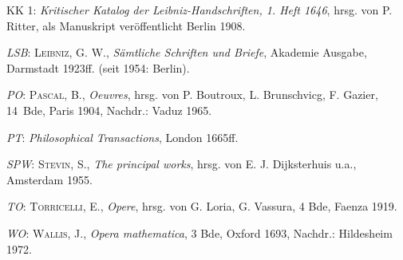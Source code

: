 \noindent\hangindent=10mm KK 1: \textit{Kritischer Katalog der Leibniz-Handschriften, 1. Heft 1646}, hrsg. von P. Ritter, als Manuskript ver\"{o}ffentlicht Berlin 1908.\par
\noindent\hangindent=10mm\textit{LSB}: \textsc{Leibniz, G. W.}, \textit{S\"{a}mtliche Schriften und Briefe}, Akademie Ausgabe, Darmstadt 1923ff. (seit 1954: Berlin).\par
\noindent\hangindent=10mm\textit{PO}: \textsc{Pascal, B.},	\textit{Oeuvres}, hrsg. von P. Boutroux, L. Brunschvicg, F. Gazier, 14~Bde, Paris 1904, Nachdr.: Vaduz 1965.\par
\noindent\hangindent=10mm\textit{PT}: \textit{Philosophical Transactions}, London 1665ff.\par
\noindent\hangindent=10mm\textit{SPW}: \textsc{Stevin, S.}, \textit{The principal works}, hrsg. von E. J. Dijksterhuis u.a., Amsterdam 1955.\par
\noindent\hangindent=10mm\textit{TO}: \textsc{Torricelli, E.}, \textit{Opere}, hrsg. von G. Loria, G. Vassura, 4 Bde, Faenza 1919.\par
\noindent\hangindent=10mm\textit{WO}: \textsc{Wallis, J.}, \textit{Opera mathematica}, 3 Bde, Oxford 1693, Nachdr.: Hildesheim 1972.\par
\vspace{3.0ex}

